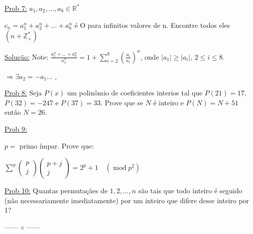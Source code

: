 \documentclass[a4paper,12pt]{article}
\renewcommand{\leq}{\ensuremath{\leqslant}}
\renewcommand{\geq}{\ensuremath{\geqslant}}
\theoremstyle{plain} %
\theoremstyle{definition} %
\theoremstyle{remark} %
\begin{document}
	\vspace{2ex}\underline{Prob 7:} $a_1, a_2, \dotso, a_8\in \mathds{R}^*$
	
	$c_n=a_1^n+a_2^n+\dotso+a_8^n$ \'e O para infinitos valores de n. Encontre todos eles $(n+\mathds{Z}_+^*)$
	
	\begin{framed}
		\underline{Solu\c{c}\~ao:} Note: $\frac{a_{1}^{n}+\ldots+a_{8}^{n}}{a_{1}^{n}}=1+\sum_{i=2}^{8}\left(\frac{a_{i}}{a_{1}}\right)^{n}$, onde $|a_1|\geq |a_i|$, $2\leq i\leq 8$.
		
		$\Rightarrow \exists a_2=-a_1\dotso$ $_\square$
	\end{framed}
	
	\vspace{2ex}\underline{Prob 8:} Seja $P(x)$ um polin\^omio de coeficientes interios tal que $P(21)=17$, $P(32)=-247$ e $P(37)=33$. Prove que se $N$ \'e inteiro e $P(N)=N+51$ ent\~ao $N=26$.
	
	\vspace{2ex}\underline{Prob 9:}
	
	$p=$ primo \'impar. Prove que:
	
	\begin{center}
		$\sum\limits^{p}\left(\begin{matrix}p \\ j\end{matrix}\right)\left(\begin{matrix}p+j \\ j\end{matrix}\right)=2^{p}+1 \quad\left(\operatorname{mod} p^{2}\right)$
	\end{center}
	
	\vspace{2ex}\underline{Prob 10:} Quantas permuta\c{c}\~aes de $1, 2, \dotso, n$ s\~ao tais que todo inteiro \'e seguido (n\~ao necessariamente imediatamente) por um inteiro que difere desse inteiro por 1?
	
	------ $\shortparallel$ ------
	
\end{document}
